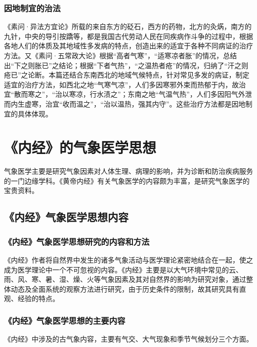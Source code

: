 \documentclass[draft,12pt]{ctexbook}
\begin{document}
\subsubsection{因地制宜的治法}%

《素问·异法方宜论》所载的来自东方的砭石，西方的药物，北方的灸焫，南方的九针，中央的导引按蹻等，都是我国古代劳动人民在同疾病作斗争的过程中，根据各地人们的体质及其地域性多发病的特点，创造出来的适宜于各种不同病证的治疗方法。又《素问·五常政大论》根据“高者气寒”，“适寒凉者胀”的情况，总结出“下之则胀已”之结论；根据“下者气热”，“之温热者疮”的情况，归纳了“汗之则疮已”之论断。本篇还结合东南西北的地域气候特点，针对常见多发的病证，制定适宜的治疗方法，如西北之地“气寒气凉”，人们多因寒邪外束而热郁于内，故治宜“散而寒之”，“治以寒凉，行水渍之”；东南之地“气温气热”，人们多因阳气外泄而内生虚寒，治宜“收而温之”，“治以温热，强其内守”。这些治疗方法都是因地制宜的具体体现。

\section{《内经》的气象医学思想}%

气象医学主要是研究气象因素对人体生理、病理的影响，并为诊断和防治疾病服务的一门边缘学科。《黄帝内经》有关气象医学的内容颇为丰富，是研究气象医学的宝贵资料。

\subsection{《内经》气象医学思想内容}%

\subsubsection{《内经》气象医学思想研究的内容和方法}%

《内经》作者将自然界中发生的诸多气象活动与医学理论紧密地结合在一起，使之成为医学理论中一个不可忽视的内容。《内经》主要是以大气环境中常见的云、雨、风、寒、暑、湿、燥、火等气象因素及其对自然界的影响为研究对象，通过整体动态及全面系统的观察方法进行研究，由于历史条件的限制，故其研究具有直观、经验的特点。

\subsubsection{《内经》气象医学思想的主要内容}%

《内经》中涉及的古气象内容，主要有气交、大气现象和季节气候划分三个方面。
\end{document}
